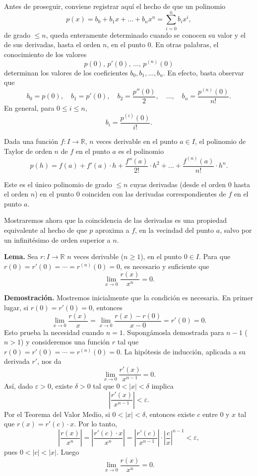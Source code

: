 \documentclass[12pt,oneside]{book}
\begin{document}
Antes de proseguir, conviene registrar aquí el hecho de que un polinomio
\[
p(x) = b_0 + b_1 x + \dots + b_n x^n = \sum_{i=0}^{n} b_i x^i,
\]
de grado \( \leq n \), queda enteramente determinado cuando se conocen su valor y el de sus derivadas, hasta el orden \( n \), en el punto \( 0 \). En otras palabras, el conocimiento de los valores
\[
p(0), \, p'(0), \, \dots, \, p^{(n)}(0)
\]
determinan los valores de los coeficientes \( b_0, b_1, \dots, b_n \). En efecto, basta observar que
\[
b_0 = p(0), \quad b_1 = p'(0), \quad b_2 = \frac{p''(0)}{2}, \quad \dots, \quad b_n = \frac{p^{(n)}(0)}{n!}.
\]
En general, para \( 0 \leq i \leq n \),
\[
b_i = \frac{p^{(i)}(0)}{i!}.
\]

Dada una función \( f: I \to \mathbb{R} \), \( n \) veces derivable en el punto \( a \in I \), el polinomio de Taylor de orden \( n \) de \( f \) en el punto \( a \) es el polinomio
\[
p(h) = f(a) + f'(a) \cdot h + \frac{f''(a)}{2!} \cdot h^2 + \dots + \frac{f^{(n)}(a)}{n!} \cdot h^n.
\]

Este es el único polinomio de grado \( \leq n \) cuyas derivadas (desde el orden \( 0 \) hasta el orden \( n \)) en el punto \( 0 \) coinciden con las derivadas correspondientes de \( f \) en el punto \( a \).

Mostraremos ahora que la coincidencia de las derivadas es una propiedad equivalente al hecho de que \( p \) aproxima a \( f \), en la vecindad del punto \( a \), salvo por un infinitésimo de orden superior a \( n \).

\textbf{Lema.} Sea \( r : I \to \mathbb{R} \) \( n \) veces derivable (\( n \geq 1 \)), en el punto \( 0 \in I \).  
Para que \( r(0) = r'(0) = \cdots = r^{(n)}(0) = 0 \), es necesario y suficiente que  
\[
\lim_{x \to 0} \frac{r(x)}{x^n} = 0.
\]

\textbf{Demostración.} Mostremos inicialmente que la condición es necesaria. En primer lugar, si \( r(0) = r'(0) = 0 \), entonces  
\[
\lim_{x \to 0} \frac{r(x)}{x} = \lim_{x \to 0} \frac{r(x) - r(0)}{x - 0} = r'(0) = 0.
\]  
Esto prueba la necesidad cuando \( n = 1 \). Supongámosla demostrada para \( n - 1 \) (\( n > 1 \)) y consideremos una función \( r \) tal que \( r(0) = r'(0) = \cdots = r^{(n)}(0) = 0 \). La hipótesis de inducción, aplicada a su derivada \( r' \), nos da  
\[
\lim_{x \to 0} \frac{r'(x)}{x^{n-1}} = 0.
\]  
Así, dado \( \varepsilon > 0 \), existe \( \delta > 0 \) tal que \( 0 < |x| < \delta \) implica  
\[
\left| \frac{r'(x)}{x^{n-1}} \right| < \varepsilon.
\]  
Por el Teorema del Valor Medio, si \( 0 < |x| < \delta \), entonces existe \( c \) entre \( 0 \) y \( x \) tal que \( r(x) = r'(c) \cdot x \). Por lo tanto,  
\[
\left| \frac{r(x)}{x^n} \right|
= \left| \frac{r'(c) \cdot x}{x^n} \right|
= \left| \frac{r'(c)}{x^{n-1}} \right| \cdot \left| \frac{c}{x} \right|^{n-1}
< \varepsilon,
\]  
pues \( 0 < |c| < |x| \). Luego  
\[
\lim_{x \to 0} \frac{r(x)}{x^n} = 0.
\]
\end{document}

